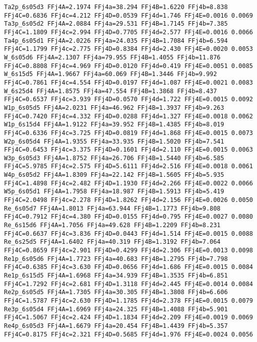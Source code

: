 {\begin{verbatim}
Ta2p_6s05d3 FFj4A=2.1974 FFj4a=38.294 FFj4B=1.6220 FFj4b=8.838 FFj4C=0.6836 FFj4c=4.212 FFj4D=0.0539 FFj4d=1.746 FFj4E=0.0016 0.0069 
Ta3p_6s05d2 FFj4A=2.0884 FFj4a=29.531 FFj4B=1.7145 FFj4b=7.385 FFj4C=1.1809 FFj4c=2.994 FFj4D=0.7705 FFj4d=2.577 FFj4E=0.0016 0.0066 
Ta4p_6s05d1 FFj4A=2.0226 FFj4a=24.035 FFj4B=1.7084 FFj4b=6.594 FFj4C=1.1799 FFj4c=2.775 FFj4D=0.8384 FFj4d=2.430 FFj4E=0.0020 0.0053 
W_6s05d6 FFj4A=2.1307 FFj4a=79.955 FFj4B=1.4055 FFj4b=11.876 FFj4C=0.8808 FFj4c=4.969 FFj4D=0.0120 FFj4d=0.419 FFj4E=0.0051 0.0085 
W_6s15d5 FFj4A=1.9667 FFj4a=60.069 FFj4B=1.3446 FFj4b=9.992 FFj4C=0.7861 FFj4c=4.554 FFj4D=0.0197 FFj4d=1.087 FFj4E=0.0021 0.0083 
W_6s25d4 FFj4A=1.8575 FFj4a=47.554 FFj4B=1.3868 FFj4b=8.437 FFj4C=0.6537 FFj4c=3.939 FFj4D=0.0570 FFj4d=1.722 FFj4E=0.0015 0.0092 
W1p_6s05d5 FFj4A=2.0231 FFj4a=46.962 FFj4B=1.3937 FFj4b=9.263 FFj4C=0.7420 FFj4c=4.332 FFj4D=0.0288 FFj4d=1.327 FFj4E=0.0018 0.0062 
W1p_6s15d4 FFj4A=1.9122 FFj4a=39.952 FFj4B=1.4385 FFj4b=8.019 FFj4C=0.6336 FFj4c=3.725 FFj4D=0.0819 FFj4d=1.868 FFj4E=0.0015 0.0073 
W2p_6s05d4 FFj4A=1.9355 FFj4a=33.935 FFj4B=1.5020 FFj4b=7.541 FFj4C=0.6453 FFj4c=3.375 FFj4D=0.1601 FFj4d=2.110 FFj4E=0.0015 0.0063 
W3p_6s05d3 FFj4A=1.8752 FFj4a=26.706 FFj4B=1.5440 FFj4b=6.585 FFj4C=5.9785 FFj4c=2.575 FFj4D=5.6111 FFj4d=2.516 FFj4E=0.0018 0.0061 
W4p_6s05d2 FFj4A=1.8309 FFj4a=22.142 FFj4B=1.5605 FFj4b=5.935 FFj4C=1.4898 FFj4c=2.482 FFj4D=1.1930 FFj4d=2.266 FFj4E=0.0022 0.0066 
W5p_6s05d1 FFj4A=1.7958 FFj4a=18.987 FFj4B=1.5913 FFj4b=5.419 FFj4C=2.0498 FFj4c=2.278 FFj4D=1.8262 FFj4d=2.156 FFj4E=0.0026 0.0050 
Re_6s05d7 FFj4A=1.8013 FFj4a=63.944 FFj4B=1.1773 FFj4b=9.808 FFj4C=0.7912 FFj4c=4.380 FFj4D=0.0155 FFj4d=0.795 FFj4E=0.0027 0.0080 
Re_6s15d6 FFj4A=1.7056 FFj4a=49.628 FFj4B=1.2209 FFj4b=8.231 FFj4C=0.6637 FFj4c=3.836 FFj4D=0.0443 FFj4d=1.514 FFj4E=0.0015 0.0088 
Re_6s25d5 FFj4A=1.6402 FFj4a=40.319 FFj4B=1.3192 FFj4b=7.064 FFj4C=0.8659 FFj4c=2.901 FFj4D=0.4299 FFj4d=2.306 FFj4E=0.0013 0.0098 
Re1p_6s05d6 FFj4A=1.7723 FFj4a=40.683 FFj4B=1.2795 FFj4b=7.798 FFj4C=0.6385 FFj4c=3.630 FFj4D=0.0656 FFj4d=1.686 FFj4E=0.0015 0.0084 
Re1p_6s15d5 FFj4A=1.6968 FFj4a=34.939 FFj4B=1.3535 FFj4b=6.851 FFj4C=1.7292 FFj4c=2.681 FFj4D=1.3118 FFj4d=2.445 FFj4E=0.0014 0.0084 
Re2p_6s05d5 FFj4A=1.7305 FFj4a=30.305 FFj4B=1.3808 FFj4b=6.606 FFj4C=1.5787 FFj4c=2.630 FFj4D=1.1785 FFj4d=2.378 FFj4E=0.0015 0.0079 
Re3p_6s05d4 FFj4A=1.6969 FFj4a=24.325 FFj4B=1.4088 FFj4b=5.901 FFj4C=1.5067 FFj4c=2.424 FFj4D=1.1834 FFj4d=2.209 FFj4E=0.0019 0.0069 
Re4p_6s05d3 FFj4A=1.6679 FFj4a=20.454 FFj4B=1.4439 FFj4b=5.357 FFj4C=0.8175 FFj4c=2.321 FFj4D=0.5685 FFj4d=1.976 FFj4E=0.0024 0.0056 

\end{verbatim}}
